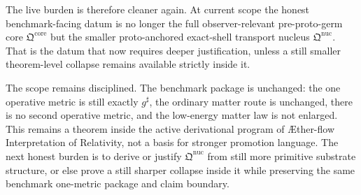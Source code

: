 \documentclass[11pt]{article}
\newcommand{\Aflow}{\AE{}ther-flow}
\newcommand{\TheoryName}{\Aflow{} Interpretation of Relativity}
\newcommand{\CompletedMetric}{g^{\sharp}}
\newcommand{\PreProtoCore}{\mathfrak Q^{\mathrm{core}}}
\newcommand{\PreProtoNucleus}{\mathfrak Q^{\mathrm{nuc}}}
\begin{document}
The live burden is therefore cleaner again. At current scope the honest benchmark-facing datum is no longer the full observer-relevant pre-proto-germ core \(\PreProtoCore\) but the smaller proto-anchored exact-shell transport nucleus \(\PreProtoNucleus\). That is the datum that now requires deeper justification, unless a still smaller theorem-level collapse remains available strictly inside it.

The scope remains disciplined. The benchmark package is unchanged: the one operative metric is still exactly \(\CompletedMetric\), the ordinary matter route is unchanged, there is no second operative metric, and the low-energy matter law is not enlarged. This remains a theorem inside the active derivational program of \TheoryName{}, not a basis for stronger promotion language. The next honest burden is to derive or justify \(\PreProtoNucleus\) from still more primitive substrate structure, or else prove a still sharper collapse inside it while preserving the same benchmark one-metric package and claim boundary.
\end{document}
